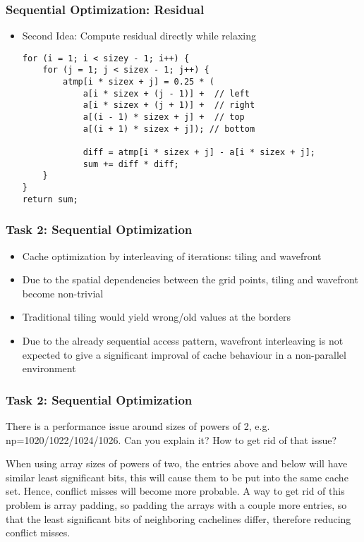 \begin{frame}[fragile]
\frametitle{Sequential Optimization: Residual}
\begin {itemize}

\item Second Idea: Compute residual directly while relaxing
\begin{lstlisting}
for (i = 1; i < sizey - 1; i++) {
	for (j = 1; j < sizex - 1; j++) {
		atmp[i * sizex + j] = 0.25 * (
			a[i * sizex + (j - 1)] +  // left
			a[i * sizex + (j + 1)] +  // right
			a[(i - 1) * sizex + j] +  // top
			a[(i + 1) * sizex + j]); // bottom
			
			diff = atmp[i * sizex + j] - a[i * sizex + j];
			sum += diff * diff;
	}
}
return sum;
\end{lstlisting}

\end {itemize}
\end{frame}

\begin{frame}[fragile]
\frametitle{Task 2: Sequential Optimization}
\begin {itemize}

\item Cache optimization by interleaving of iterations: tiling and wavefront
\item Due to the spatial dependencies between the grid points, tiling and wavefront become non-trivial
\item Traditional tiling would yield wrong/old values at the borders
\item Due to the already sequential access pattern, wavefront interleaving is not expected to give a significant improval of cache behaviour in a non-parallel environment

\end {itemize}
\end{frame}

\begin{frame}[fragile]
\frametitle{Task 2: Sequential Optimization}

 There is a performance issue around sizes of powers of 2, e.g. np=1020/1022/1024/1026. Can you explain it? How to get rid of that issue?
 
 When using array sizes of powers of two, the entries above and below will have similar least significant bits, this will cause them to be put into the same cache set. Hence, conflict misses will become more probable.
 A way to get rid of this problem is array padding, so padding the arrays with a couple more entries, so that the least significant bits of neighboring cachelines differ, therefore reducing conflict misses.


\end{frame}

